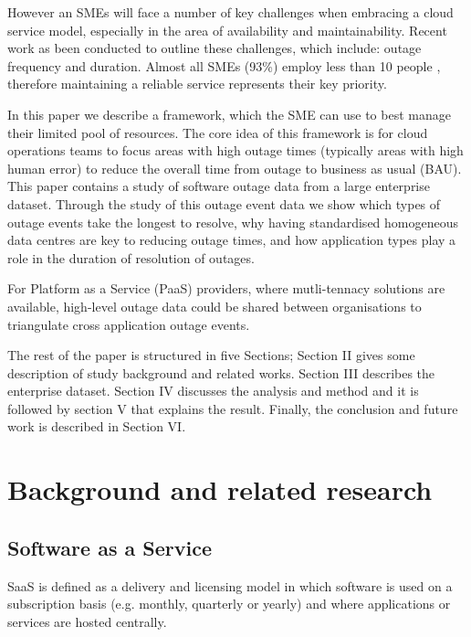 \documentclass[conference]{IEEEtran}
\begin{document}
However an SMEs will face a number of key challenges when embracing a cloud service model, especially in the area of availability and maintainability. Recent work as been conducted to outline these challenges, which include: outage frequency and duration. Almost all SMEs (93\%) employ less than 10 people \cite{europa2015sme}, therefore maintaining a reliable service represents their key priority. \par

In this paper we describe a framework, which the SME can use to best manage their limited pool of resources. The core idea of this framework is for cloud operations teams to focus areas with high outage times (typically areas with high human error) to reduce the overall time from outage to business as usual (BAU). This paper contains a study of software outage data from a large enterprise dataset. Through the study of this outage event data we show which types of outage events take the longest to resolve, why having standardised homogeneous data centres are key to reducing outage times, and how application types play a role in the duration of resolution of outages. \par

For Platform as a Service (PaaS) providers, where mutli-tennacy solutions are available, high-level outage data could be shared between organisations to triangulate cross application outage events. \par

The rest of the paper is structured in five Sections; Section II gives some description of study background and related works. Section III describes the enterprise dataset. Section IV discusses the analysis and method and it is followed by section V that explains the result. Finally, the conclusion and future work is described in Section VI. \par


\section{Background and related research}

\subsection{Software as a Service}
SaaS is defined as a delivery and licensing model in which software is used on a subscription basis (e.g. monthly, quarterly or yearly) and where applications or services are hosted centrally. \par
\end{document}
